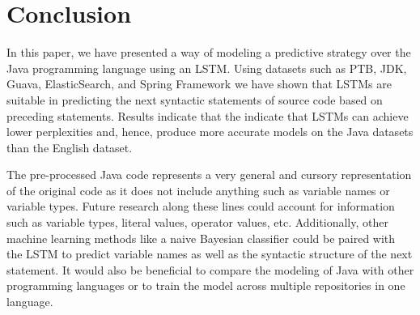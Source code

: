 \documentclass[runningheads,a4paper]{llncs}
\begin{document}

\section{Conclusion}

In this paper, we have presented a way of modeling a predictive strategy
over the Java programming language using an LSTM. Using datasets such as PTB,
JDK, Guava, ElasticSearch, and Spring Framework we have shown that
LSTMs are suitable in predicting the next syntactic statements of source
code based on preceding statements. Results indicate that the indicate
that LSTMs can achieve lower perplexities and, hence, produce more accurate models
on the Java datasets than the English dataset.

The pre-processed Java code represents a very general and cursory
representation of the original code as it does not include anything such
as variable names or variable types. Future research along these lines
could account for information such as variable types, literal values,
operator values, etc. Additionally, other machine learning methods like
a naive Bayesian classifier could be paired with the LSTM to predict
variable names as well as the syntactic structure of the next statement.
It would also be beneficial to compare the modeling of Java with other
programming languages or to train the model across multiple repositories
in one language.








\end{document}
